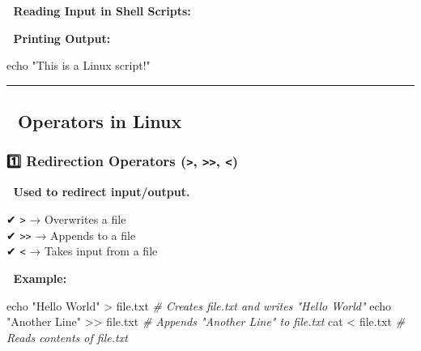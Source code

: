 \documentclass[
]{article}
\newenvironment{Shaded}{}{}
\newcommand{\BuiltInTok}[1]{\textcolor[rgb]{0.00,0.50,0.00}{#1}}
\newcommand{\CommentTok}[1]{\textcolor[rgb]{0.38,0.63,0.69}{\textit{#1}}}
\newcommand{\FunctionTok}[1]{\textcolor[rgb]{0.02,0.16,0.49}{#1}}
\newcommand{\NormalTok}[1]{#1}
\newcommand{\OperatorTok}[1]{\textcolor[rgb]{0.40,0.40,0.40}{#1}}
\newcommand{\StringTok}[1]{\textcolor[rgb]{0.25,0.44,0.63}{#1}}
\newcommand{\VariableTok}[1]{\textcolor[rgb]{0.10,0.09,0.49}{#1}}
\begin{document}
📌 \textbf{Reading Input in Shell Scripts:}

\begin{Shaded}
\end{Shaded}

📌 \textbf{Printing Output:}

\begin{Shaded}
\begin{Highlighting}[]
\BuiltInTok{echo} \StringTok{"This is a Linux script!"}
\end{Highlighting}
\end{Shaded}

\begin{center}\rule{0.5\linewidth}{0.5pt}\end{center}

\subsection{\texorpdfstring{\textbf{📌 Operators in
Linux}}{📌 Operators in Linux}}\label{operators-in-linux}

\subsubsection{\texorpdfstring{\textbf{1️⃣ Redirection Operators
(\texttt{\textgreater{}}, \texttt{\textgreater{}\textgreater{}},
\texttt{\textless{}})}}{1️⃣ Redirection Operators (\textgreater, \textgreater\textgreater, \textless)}}\label{redirection-operators}

📌 \textbf{Used to redirect input/output.}

✔ \texttt{\textgreater{}} → Overwrites a file\\
✔ \texttt{\textgreater{}\textgreater{}} → Appends to a file\\
✔ \texttt{\textless{}} → Takes input from a file

📌 \textbf{Example:}

\begin{Shaded}
\begin{Highlighting}[]
\BuiltInTok{echo} \StringTok{"Hello World"} \OperatorTok{\textgreater{}}\NormalTok{ file.txt  }\CommentTok{\# Creates file.txt and writes "Hello World"}
\BuiltInTok{echo} \StringTok{"Another Line"} \OperatorTok{\textgreater{}\textgreater{}}\NormalTok{ file.txt  }\CommentTok{\# Appends "Another Line" to file.txt}
\FunctionTok{cat} \OperatorTok{\textless{}}\NormalTok{ file.txt  }\CommentTok{\# Reads contents of file.txt}
\end{Highlighting}
\end{Shaded}
\end{document}
